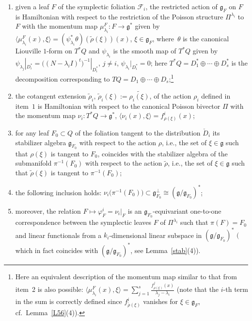 \begin{Lemma}
\begin{enumerate}
 \begin{gather}\label{mom}
 \mu_\lambda=\mu_{\rm can}\circ\psi(\lambda),
 \end{gather}
 where $\mu_{\rm can}$ is the moment map corresponding to the canonical Poisson bivector~$\Pi$;
 \item[$3)$] given a leaf $F$ of the symplectic foliation $\mathcal{F}_i$, the restricted action
 of $\mathfrak{g}_F$ on $F$ is Hamiltonian with respect to the restriction of the Poisson structure $\Pi^{\lambda_i}$ to $F$ with the momentum map $\mu_{\lambda_i}^F\colon F\to \mathfrak{g}^*$ given by $\big\langle\mu_{\lambda_i}^F(x),\xi\big\rangle=(\psi_{\lambda_i}^*\theta)(\tilde\rho(\xi))(x)$, $\xi\in \mathfrak{g}_F$, where~$\theta$ is the canonical Liouville $1$-form on $T^*Q$ and $\psi_{\lambda_i}$ is the smooth map of $T^*Q$ given by $\psi_{\lambda_j}|_{D^*_i}=\big((N-\lambda_i I)^t\big)^{-1}|_{D^*_i}$, $j\not=i$, $\psi_{\lambda_i}|_{D^*_i}=0$; here $T^*Q=D^*_1\oplus\cdots\oplus D^*_s$ is the decomposition corresponding to $TQ=D_1\oplus\cdots\oplus D_s$;\footnote{Here an equivalent description of the momentum map similar to that from item~2 is also possible: $\langle\mu_{\lambda_i}^F(x),\xi\rangle=\sum\limits_{j=1}^s\frac{f^j_{\rho(\xi)}(x)}{\lambda_j-\lambda_i}$ (note that the $i$-th term in the sum is correctly defined since $f^i_{\tilde\rho(\xi)}$ vanishes for $\xi\in \mathfrak{g}_F$, cf.\ Lemma~\ref{L56}(4)).}
\item[$4)$] the cotangent extension $\tilde\rho_i$, $\tilde\rho_i(\xi):=\widetilde{\rho_i(\xi)}$, of the action $\rho_i$ defined in item~$1$ is Hamiltonian with respect to the canonical Poisson bivector $\Pi$ with the momentum map $\nu_i\colon T^*Q\to\mathfrak{g}^*$, $\langle\nu_i(x),\xi\rangle={f^i_{\rho(\xi)}(x)}$;
 \item[$5)$] for any leaf $F_0 \subset Q$ of the foliation tangent to the distribution $\check D_i$ its stabilizer algebra $\mathfrak{g}_{F_0}$ with respect to the action $\rho$, i.e., the set of $\xi\in \mathfrak{g}$ such that $\rho(\xi)$ is tangent to $F_0$, coincides with the stabilizer algebra of the submanifold $\pi^{-1}(F_0)$ with respect to the action $\tilde\rho$, i.e., the set of $\xi\in \mathfrak{g}$ such that $\tilde\rho(\xi)$ is tangent to $\pi^{-1}(F_0)$;
 \item[$6)$] the following inclusion holds: $\nu_i\big(\pi^{-1}(F_0)\big)\subset \mathfrak{g}_{F_0}^\bot\cong (\mathfrak{g}/\mathfrak{g}_{F_0})^*$;
\item[$7)$] moreover, the relation $F\mapsto\varphi_F^i=\nu_i|_F$ is an $\mathfrak{g}_{F_0}$-equivariant one-to-one correspondence between the symplectic leaves $F$ of $\Pi^{\lambda_i}$ such that $\pi(F)=F_0$ and linear functionals from a $k_i$-dimensional linear subspace in $(\mathfrak{g}/\mathfrak{g}_{F_0})^*$ $($which in fact coincides with $(\mathfrak{g}/\mathfrak{g}_{F_0})^*$, see Lemma~{\rm \ref{stab}(4))}.

\end{enumerate}
\end{Lemma}
